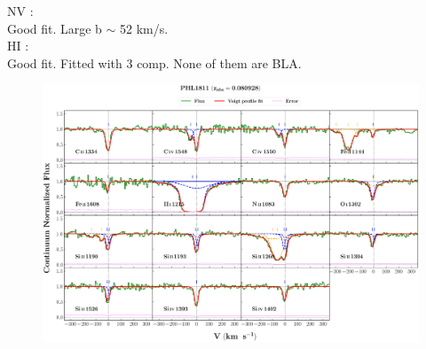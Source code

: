 \documentclass[12pt]{report}
\begin{document}
NV :  \\  \hspace*{1.5cm}
        Good fit. Large b  $\sim$  52 km/s.  \\

HI :  \\  \hspace*{1.5cm}
        Good fit. Fitted with 3 comp. None of them are BLA.  \\



\newpage

\begin{landscape}

\begin{figure}
    \centering
    \vspace{-20mm}
    \hspace*{-35mm}
    \includegraphics[width=1.25\linewidth]{System-Plots/PHL1811_z=0.080928_sys_plot.png}
\end{figure}

\end{landscape}
\end{document}
